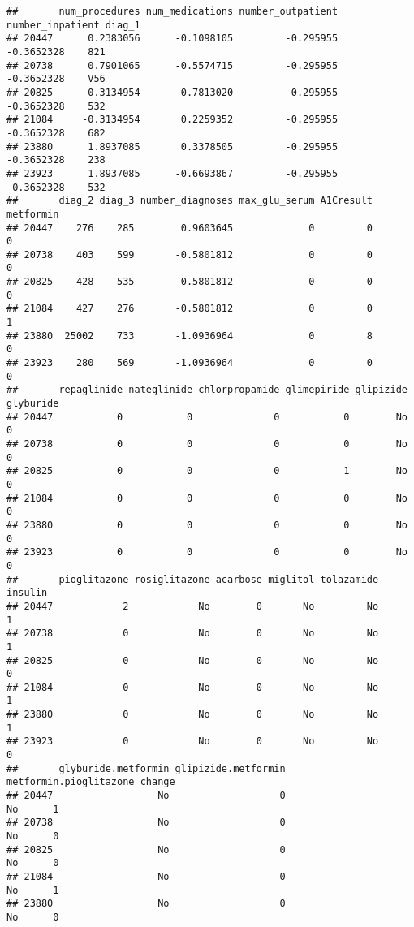 \documentclass[
]{article}
\begin{document}
\begin{verbatim}
##       num_procedures num_medications number_outpatient number_inpatient diag_1
## 20447      0.2383056      -0.1098105         -0.295955       -0.3652328    821
## 20738      0.7901065      -0.5574715         -0.295955       -0.3652328    V56
## 20825     -0.3134954      -0.7813020         -0.295955       -0.3652328    532
## 21084     -0.3134954       0.2259352         -0.295955       -0.3652328    682
## 23880      1.8937085       0.3378505         -0.295955       -0.3652328    238
## 23923      1.8937085      -0.6693867         -0.295955       -0.3652328    532
##       diag_2 diag_3 number_diagnoses max_glu_serum A1Cresult metformin
## 20447    276    285        0.9603645             0         0         0
## 20738    403    599       -0.5801812             0         0         0
## 20825    428    535       -0.5801812             0         0         0
## 21084    427    276       -0.5801812             0         0         1
## 23880  25002    733       -1.0936964             0         8         0
## 23923    280    569       -1.0936964             0         0         0
##       repaglinide nateglinide chlorpropamide glimepiride glipizide glyburide
## 20447           0           0              0           0        No         0
## 20738           0           0              0           0        No         0
## 20825           0           0              0           1        No         0
## 21084           0           0              0           0        No         0
## 23880           0           0              0           0        No         0
## 23923           0           0              0           0        No         0
##       pioglitazone rosiglitazone acarbose miglitol tolazamide insulin
## 20447            2            No        0       No         No       1
## 20738            0            No        0       No         No       1
## 20825            0            No        0       No         No       0
## 21084            0            No        0       No         No       1
## 23880            0            No        0       No         No       1
## 23923            0            No        0       No         No       0
##       glyburide.metformin glipizide.metformin metformin.pioglitazone change
## 20447                  No                   0                     No      1
## 20738                  No                   0                     No      0
## 20825                  No                   0                     No      0
## 21084                  No                   0                     No      1
## 23880                  No                   0                     No      0

\end{verbatim}
\end{document}
